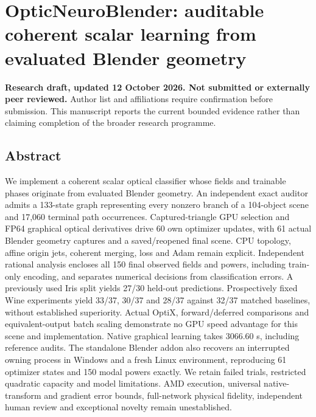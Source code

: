 \documentclass[
  10pt,
]{article}
\author{}
\date{}
\begin{document}
\hypertarget{opticneuroblender-auditable-coherent-scalar-learning-from-evaluated-blender-geometry}{%
\section{OpticNeuroBlender: auditable coherent scalar learning from
evaluated Blender
geometry}\label{opticneuroblender-auditable-coherent-scalar-learning-from-evaluated-blender-geometry}}

\textbf{Research draft, updated 12 October 2026. Not submitted or
externally peer reviewed.} Author list and affiliations require
confirmation before submission. This manuscript reports the current
bounded evidence rather than claiming completion of the broader research
programme.

\hypertarget{abstract}{%
\subsection{Abstract}\label{abstract}}

We implement a coherent scalar optical classifier whose fields and
trainable phases originate from evaluated Blender geometry. An
independent exact auditor admits a 133-state graph representing every
nonzero branch of a 104-object scene and 17,060 terminal path
occurrences. Captured-triangle GPU selection and FP64 graphical optical
derivatives drive 60 own optimizer updates, with 61 actual Blender
geometry captures and a saved/reopened final scene. CPU topology, affine
origin jets, coherent merging, loss and Adam remain explicit.
Independent rational analysis encloses all 150 final observed fields and
powers, including train-only encoding, and separates numerical decisions
from classification errors. A previously used Iris split yields 27/30
held-out predictions. Prospectively fixed Wine experiments yield 33/37,
30/37 and 28/37 against 32/37 matched baselines, without established
superiority. Actual OptiX, forward/deferred comparisons and
equivalent-output batch scaling demonstrate no GPU speed advantage for
this scene and implementation. Native graphical learning takes 3066.60
s, including reference audits. The standalone Blender addon also
recovers an interrupted owning process in Windows and a fresh Linux
environment, reproducing 61 optimizer states and 150 modal powers
exactly. We retain failed trials, restricted quadratic capacity and
model limitations. AMD execution, universal native-transform and
gradient error bounds, full-network physical fidelity, independent human
review and exceptional novelty remain unestablished.
\end{document}
